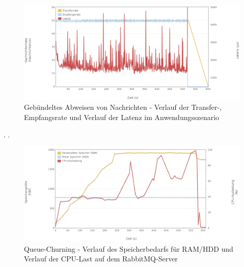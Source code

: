 \documentclass[	a4paper,
			11pt,
			titlepage,
			oneside,
			fleqn,
			listof=totoc,
			parskip,
			numbers=noenddot]{scrartcl}
\begin{document}
		\begin{figure}[!htb]
			\centering
			\includegraphics[width=\textwidth]{img/nack/nack_scenario.png}
			\caption{Gebündeltes Abweisen von Nachrichten - Verlauf der Transfer-, Empfangsrate und Verlauf der Latenz im Anwendungsszenario}
			\label{fig:nack-scenario}
		\end{figure}
	
	
	\clearpage
		{%
		  \newline
		  \newline
		  \newline
		}{%
		.
		}{%
		. 
		}
		
		\begin{figure}[!htb]
			\centering
			\includegraphics[width=\textwidth]{img/queue/queue_server1.png}
			\caption{Queue-Churning - Verlauf des Speicherbedarfs für RAM/HDD und Verlauf der CPU-Last auf dem RabbitMQ-Server}
			\label{fig:queue-server1}
		\end{figure}
		
\end{document}
